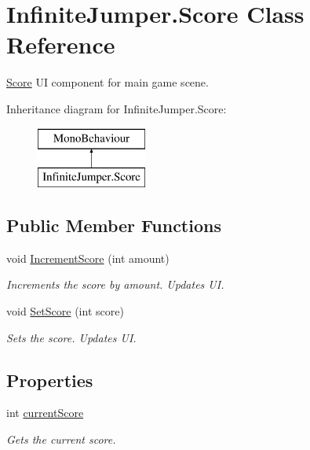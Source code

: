 \hypertarget{class_infinite_jumper_1_1_score}{}\section{Infinite\+Jumper.\+Score Class Reference}
\label{class_infinite_jumper_1_1_score}


\hyperlink{class_infinite_jumper_1_1_score}{Score} U\+I component for main game scene.  


Inheritance diagram for Infinite\+Jumper.\+Score\+:\begin{figure}[H]
\begin{center}
\leavevmode
\includegraphics[height=2.000000cm]{class_infinite_jumper_1_1_score}
\end{center}
\end{figure}
\subsection*{Public Member Functions}
\begin{DoxyCompactItemize}
\item 
void \hyperlink{class_infinite_jumper_1_1_score_a27a2d921b4d0f8cad1720fba832937c9}{Increment\+Score} (int amount)
\begin{DoxyCompactList}\small\item\em Increments the score by amount. Updates U\+I. \end{DoxyCompactList}\item 
void \hyperlink{class_infinite_jumper_1_1_score_a693c65b79e7cb47be3b49f36d87cff1b}{Set\+Score} (int score)
\begin{DoxyCompactList}\small\item\em Sets the score. Updates U\+I. \end{DoxyCompactList}\end{DoxyCompactItemize}
\subsection*{Properties}
\begin{DoxyCompactItemize}
\item 
int \hyperlink{class_infinite_jumper_1_1_score_aa9f2d756b3a3688323a8faf10d78a3c7}{current\+Score}
\begin{DoxyCompactList}\small\item\em Gets the current score. \end{DoxyCompactList}\end{DoxyCompactItemize}


